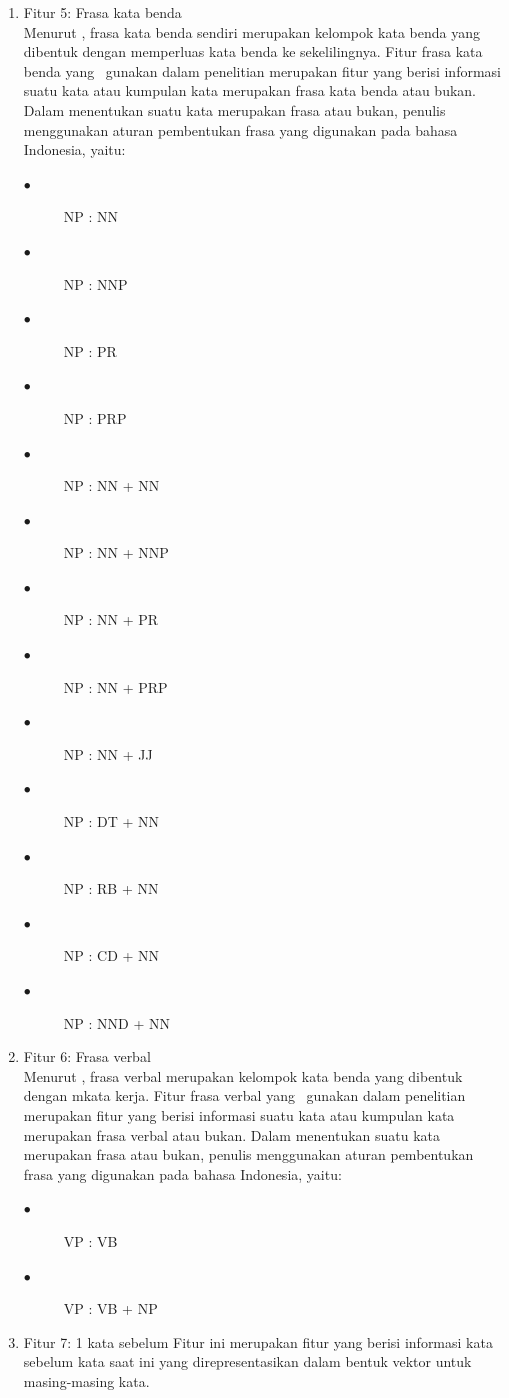 \begin{enumerate}
		\item Fitur 5: Frasa kata benda\\
		Menurut \cite{hs2005bahasa}, frasa kata benda sendiri merupakan kelompok kata benda yang dibentuk dengan memperluas kata benda ke sekelilingnya. Fitur frasa kata benda yang \saya~gunakan dalam penelitian merupakan fitur yang berisi informasi suatu kata atau kumpulan kata merupakan frasa kata benda atau bukan. Dalam menentukan suatu kata merupakan frasa atau bukan, penulis menggunakan aturan pembentukan frasa yang digunakan pada bahasa Indonesia, yaitu:
		\begin{description}
		 	\item[$\bullet$] NP : NN
		 	\item[$\bullet$] NP : NNP
		 	\item[$\bullet$] NP : PR
		 	\item[$\bullet$] NP : PRP
		 	\item[$\bullet$] NP : NN + NN
		 	\item[$\bullet$] NP : NN + NNP
		 	\item[$\bullet$] NP : NN + PR
		 	\item[$\bullet$] NP : NN + PRP
		 	\item[$\bullet$] NP : NN + JJ
		 	\item[$\bullet$] NP : DT + NN
		 	\item[$\bullet$] NP : RB + NN
		 	\item[$\bullet$] NP : CD + NN
		 	\item[$\bullet$] NP : NND + NN
		 \end{description}
	 
		 \item Fitur 6: Frasa verbal\\
		 Menurut \cite{hs2005bahasa}, frasa verbal merupakan kelompok kata benda yang dibentuk dengan mkata kerja. Fitur frasa verbal yang \saya~gunakan dalam penelitian merupakan fitur yang berisi informasi suatu kata atau kumpulan kata merupakan frasa verbal atau bukan. Dalam menentukan suatu kata merupakan frasa atau bukan, penulis menggunakan aturan pembentukan frasa yang digunakan pada bahasa Indonesia, yaitu:
		 \begin{description}
		 	\item[$\bullet$] VP : VB
		 	\item[$\bullet$] VP : VB + NP
		 \end{description}
	 
		 \item Fitur 7: 1 kata sebelum
		 Fitur ini merupakan fitur yang berisi informasi kata sebelum kata saat ini yang direpresentasikan dalam bentuk vektor untuk masing-masing kata.
		 

\end{enumerate}
